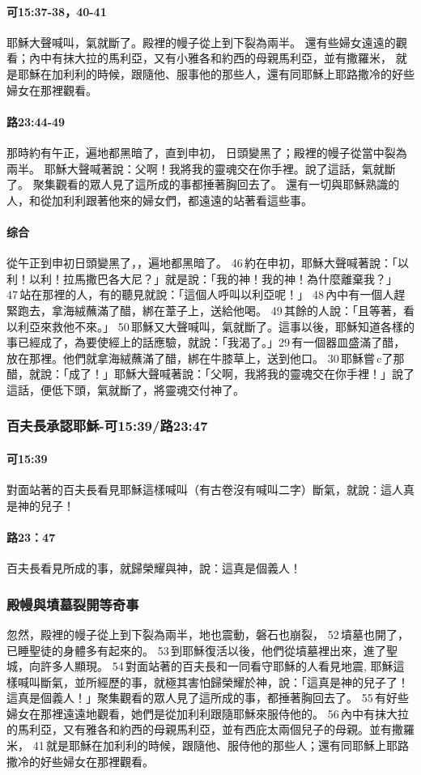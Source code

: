 \paragraph{可15:37-38，40-41}
耶穌大聲喊叫，氣就斷了。殿裡的幔子從上到下裂為兩半。
還有些婦女遠遠的觀看；內中有抹大拉的馬利亞，又有小雅各和約西的母親馬利亞，並有撒羅米，
就是耶穌在加利利的時候，跟隨他、服事他的那些人，還有同耶穌上耶路撒冷的好些婦女在那裡觀看。
\paragraph{路23:44-49}
那時約有午正，遍地都黑暗了，直到申初，
日頭變黑了；殿裡的幔子從當中裂為兩半。
耶穌大聲喊著說：父啊！我將我的靈魂交在你手裡。說了這話，氣就斷了。
聚集觀看的眾人見了這所成的事都捶著胸回去了。
還有一切與耶穌熟識的人，和從加利利跟著他來的婦女們，都遠遠的站著看這些事。
\paragraph{综合}
從午正到申初日頭變黑了，，遍地都黑暗了。 46 約在申初，耶穌大聲喊著說：「以利！以利！拉馬撒巴各大尼？」就是說：「我的神！我的神！為什麼離棄我？」 47 站在那裡的人，有的聽見就說：「這個人呼叫以利亞呢！」 48 內中有一個人趕緊跑去，拿海絨蘸滿了醋，綁在葦子上，送給他喝。 49 其餘的人說：「且等著，看以利亞來救他不來。」 50 耶穌又大聲喊叫，氣就斷了。這事以後，耶穌知道各樣的事已經成了，為要使經上的話應驗，就說：「我渴了。」29 有一個器皿盛滿了醋，放在那裡。他們就拿海絨蘸滿了醋，綁在牛膝草上，送到他口。 30 耶穌嘗 c了那醋，就說：「成了！」耶穌大聲喊著說：「父啊，我將我的靈魂交在你手裡！」說了這話，便低下頭，氣就斷了，將靈魂交付神了。

\subsubsection{百夫長承認耶穌-可15:39/路23:47}
\paragraph{可15:39}
對面站著的百夫長看見耶穌這樣喊叫（有古卷沒有喊叫二字）斷氣，就說：這人真是神的兒子！
\paragraph{路23：47}百夫長看見所成的事，就歸榮耀與神，說：這真是個義人！

\subsubsection{殿幔與墳墓裂開等奇事}
忽然，殿裡的幔子從上到下裂為兩半，地也震動，磐石也崩裂， 52 墳墓也開了，已睡聖徒的身體多有起來的。 53 到耶穌復活以後，他們從墳墓裡出來，進了聖城，向許多人顯現。 54 對面站著的百夫長和一同看守耶穌的人看見地震, 耶穌這樣喊叫斷氣，並所經歷的事，就極其害怕歸榮耀於神，說：「這真是神的兒子了！這真是個義人！」聚集觀看的眾人見了這所成的事，都捶著胸回去了。 55 有好些婦女在那裡遠遠地觀看，她們是從加利利跟隨耶穌來服侍他的。 56 內中有抹大拉的馬利亞，又有雅各和約西的母親馬利亞，並有西庇太兩個兒子的母親。並有撒羅米， 41 就是耶穌在加利利的時候，跟隨他、服侍他的那些人；還有同耶穌上耶路撒冷的好些婦女在那裡觀看。

